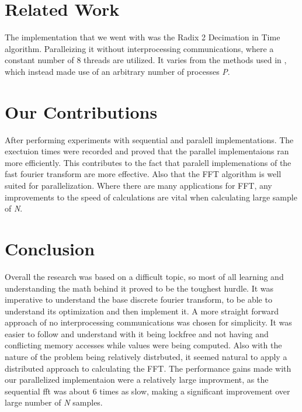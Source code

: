 \documentclass[journal]{IEEEtran}
\begin{document}
\section{Related Work}
\par{
	The implementation that we went with was the Radix 2 Decimation in Time algorithm. Paralleizing it without 
	interprocessing communications, where a constant number of 8 threads are utilized. It varies from the 
	methods used in \cite{Xie}, which instead made use of an arbitrary number of processes \textit{P}. 

	
}

\section{Our Contributions}
	\par{
		After performing experiments with sequential and paralell implementations. The exectuion times were 
		recorded and proved that the parallel implementaions ran more efficiently. This contributes to the fact 
		that paralell implemenations of the fast fourier transform are more effective. Also that the FFT algorithm 
		is well suited for parallelization. Where there are many applications for FFT, any improvements to the speed 
		of calculations are vital when calculating large sample of \textit{N}.
	}
\section{Conclusion}
	\par{
		Overall the research was based on a difficult topic, so most of all learning and understanding the 
		math behind it proved to be the toughest hurdle. It was imperative to understand the base discrete 
		fourier transform, to be able to understand its optimization and then implement it. A more straight 
		forward approach of no interprocessing communications was chosen for simplicity. It was easier to 
		follow and understand with it being lockfree and not having and conflicting memory accesses while 
		values were being computed. Also with the nature of the problem being relatively distrbuted, it 
		seemed natural to apply a distributed approach to calculating the FFT. The performance gains made 
		with our parallelized implementaion were a relatively large improvment, as the sequential fft was 
		about 6 times as slow, making a significant improvement over large number of \textit{N} samples.
	}

\medskip


\end{document}
